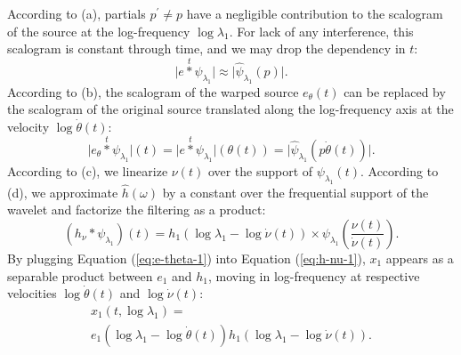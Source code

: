 \documentclass[twoside,a4paper]{article}
\begin{document}
According to (a), partials $p^{\prime} \neq p$ have a negligible contribution to the scalogram of the source at the log-frequency $\log \lambda_1$. For lack of any interference, this scalogram is constant through time, and we may drop the dependency in $t$:
\begin{equation}
\vert e \overset{t}{\ast} \psi_{\lambda_1} \vert \approx
\vert \widehat{\psi}_{\lambda_1}(p) \vert.
\end{equation}
According to (b), the scalogram of the warped source $e_\theta (t)$ can be replaced by the scalogram of the original source translated along the log-frequency axis at the velocity $\log \dot{\theta}(t)$:
\begin{equation}
\vert e_{\theta} \overset{t}{\ast} \psi_{\lambda_1} \vert (t) =
\vert e \overset{t}{\ast} \psi_{\lambda_1} \vert (\theta(t)) =
\vert \widehat{\psi}_{\lambda_1}(p \dot{\theta}(t)) \vert.
\label{eq:e-theta-1}
\end{equation}
According to (c), we linearize $\nu(t)$ over the support of $\psi_{\lambda_1}(t)$.
According to (d), we approximate $\hat{h}(\omega)$ by a constant over the frequential support of the wavelet and factorize the filtering as a product:
\begin{equation}
\left( h_\nu \ast \psi_{\lambda_1} \right)(t) =
h_{1}(\log \lambda_1 - \log \dot{\nu}(t)) \times
\psi_{\lambda_1}\left( \frac{\nu(t)}{\dot{\nu}(t)} \right).
\label{eq:h-nu-1}
\end{equation}
By plugging Equation (\ref{eq:e-theta-1}) into Equation (\ref{eq:h-nu-1}), $x_1$ appears as a separable product between $e_1$ and $h_1$, moving in log-frequency at respective velocities $\log \dot{\theta}(t)$ and $\log \dot{\nu}(t)$:
\begin{multline}
x_1(t,\log \lambda_1) = \\
e_{1}(\log \lambda_1 - \log \dot{\theta}(t))
h_{1}(\log \lambda_1 - \log \dot{\nu}(t)).
\label{eq:factorization}
\end{multline}
\end{document}
